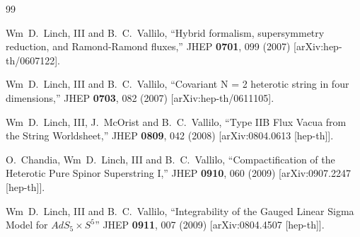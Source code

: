 \documentclass[9pt]{beamer}
\begin{document}

\begin{thebibliography}{99}

  Wm~D.~Linch, III and B.~C.~Vallilo,
  ``Hybrid formalism, supersymmetry reduction, and Ramond-Ramond fluxes,''
  JHEP {\bf 0701}, 099 (2007)
  [arXiv:hep-th/0607122].
  

  Wm~D.~Linch, III and B.~C.~Vallilo,
  ``Covariant N = 2 heterotic string in four dimensions,''
  JHEP {\bf 0703}, 082 (2007)
  [arXiv:hep-th/0611105].

  
  Wm~D.~Linch, III, J.~McOrist and B.~C.~Vallilo,
  ``Type IIB Flux Vacua from the String Worldsheet,''
  JHEP {\bf 0809}, 042 (2008)
  [arXiv:0804.0613 [hep-th]].


  O.~Chandia, Wm~D.~Linch, III and B.~C.~Vallilo,
  ``Compactification of the Heterotic Pure Spinor Superstring I,''
  JHEP {\bf 0910}, 060 (2009)
  [arXiv:0907.2247 [hep-th]].

  Wm~D.~Linch, III and B.~C.~Vallilo,
  ``Integrability of the Gauged Linear Sigma Model for $AdS_5\times S^5$''
  JHEP {\bf 0911}, 007 (2009)
  [arXiv:0804.4507 [hep-th]].


\end{thebibliography}
\end{document}
